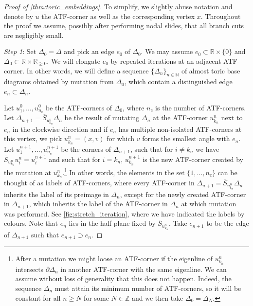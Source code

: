 \documentclass[12pt,a4paper,abstract=true,final]{scrartcl}
\begin{document}
\begin{proof}[Proof of \cref{thm:toric_embeddings}]
To simplify, we slightly abuse notation and denote by $u$ the ATF-corner as well as the corresponding vertex $x$. Throughout the proof we assume, possibly after performing nodal slides, that all branch cuts are negligibly small.

\medskip

\emph{Step 1}:
Set $Δ_0 = Δ$ and pick an edge $e_0$ of $Δ_0$.
We may assume $e_0 ⊂ ℝ × \{0\}$ and $Δ_0 ⊂ ℝ × ℝ_{ ≥0}$.
We will elongate $e_0$ by repeated iterations at an adjacent ATF-corner.
In other words, we will define a sequence $\{\Delta_n\}_{n \in  \mathbb{N}}$ of almost toric base diagrams obtained by mutation from $\Delta_0$, which contain a distinguished edge $e_n \subset \Delta_n$.

Let $u_1^0,…,u_{n_c}^0$ be the ATF-corners of $Δ_0$, where $n_c$ is the number of ATF-corners.
Let $Δ_{n+1} = \overline{S}_{u_{k_n}^n} Δ_n$ be the result of mutating $Δ_n$ at the ATF-corner $u_{k_n}^n$ next to $e_n$ in the clockwise direction and if $e_n$ has multiple non-isolated ATF-corners at this vertex, we pick $u_{k_n}^n = (x,v)$ for which $v$ forms the smallest angle with $e_n$.
Let $u_1^{n+1},…,u_{n_c}^{n+1}$ be the corners of $Δ_{n+1}$, such that for $i ≠ k_n$ we have $\overline{S}_{u_{k_n}^n} u_i^n = u_i^{n+1}$ and such that for $i=k_n$, $u_{k_n}^{n+1}$ is the new ATF-corner created by the mutation at $u_{k_n}^n$.\footnote{After a mutation we might loose an ATF-corner if the eigenline of $u_{k_n}^n$ intersects $∂Δ_n$ in another ATF-corner with the same eigenline.
We can assume without loss of generality that this does not happen. Indeed, the sequence $Δ_n$ must attain its minimum number of ATF-corners, so it will be constant for all $n ≥N$ for some $N ∈ ℤ$ and we then take $Δ_0=Δ_N$.} In other words, the elements in the set $\{1,\ldots,n_c\}$ can be thought of as labels of ATF-corners, where every ATF-corner in $Δ_{n+1} = \overline{S}_{u_{k_n}^n} Δ_n$ inherits the label of its preimage in $\Delta_n$, except for the newly created ATF-corner in $\Delta_{n+1}$, which inherits the label of the ATF-corner in $\Delta_n$ at which mutation was performed.
See \cref{fig:stretch_iteration}, where we have indicated the labels by colours.
Note that $e_n$ lies in the half plane fixed by $\overline{S}_{u_{k_n}^n}$.
Take $e_{n+1}$ to be the edge of $Δ_{n+1}$ such that $e_{n+1} ⊃ e_n$.


\end{proof}
\end{document}
